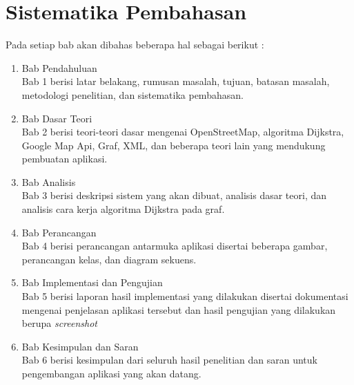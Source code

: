 \section{Sistematika Pembahasan}
Pada setiap bab akan dibahas beberapa hal sebagai berikut :
\begin{enumerate}
	\item Bab Pendahuluan\\
	Bab 1 berisi latar belakang, rumusan masalah, tujuan, batasan masalah, metodologi penelitian, dan sistematika pembahasan.
	
	\item Bab Dasar Teori\\
	Bab 2 berisi teori-teori dasar mengenai OpenStreetMap, algoritma Dijkstra,
	Google Map Api, Graf, XML, dan beberapa teori lain yang mendukung pembuatan
	aplikasi.
	
	\item Bab Analisis\\
	Bab 3 berisi deskripsi sistem yang akan dibuat, analisis dasar teori, dan
	analisis cara kerja algoritma Dijkstra pada graf.
	
	\item Bab Perancangan\\
	Bab 4 berisi perancangan antarmuka aplikasi disertai beberapa gambar,
	perancangan kelas, dan diagram sekuens.
	
	\item Bab Implementasi dan Pengujian\\
	Bab 5 berisi laporan hasil implementasi yang dilakukan disertai dokumentasi
	mengenai penjelasan aplikasi tersebut dan hasil pengujian yang dilakukan berupa
	\textit{screenshot}
	
	\item Bab Kesimpulan dan Saran\\
	Bab 6 berisi kesimpulan dari seluruh hasil penelitian dan saran untuk
	pengembangan aplikasi yang akan datang.
\end{enumerate}